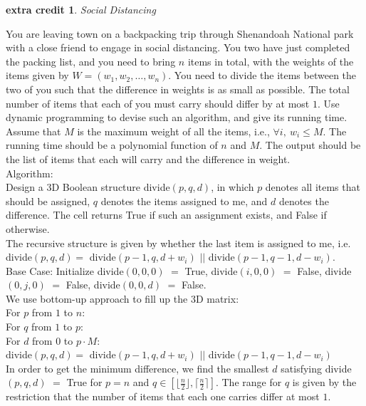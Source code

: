 \documentclass[10pt]{article}
\newtheorem{extra}{\sc\color{cit}extra credit}
\begin{document}
\begin{extra} Social Distancing \end{extra}

You are leaving town on a backpacking trip through Shenandoah National park with a close friend to engage in social distancing. You two have just completed the packing list, and you need to bring $n$ items in total, with the weights of the items given by $W=(w_1, w_2, \ldots, w_n)$. You need to divide the items between the two of you such that the difference in weights is as small as possible. The total number of items that each of you must carry should differ by at most $1$. Use dynamic programming to devise such an algorithm, and give its running time.  Assume that $M$ is the maximum weight of all the items, i.e., $\forall i, \ w_i \leq M$. The running time should be a polynomial function of $n$ and $M$. The output should be the list of items that each will carry and the difference in weight.
\\
Algorithm:\\
Design a 3D Boolean structure divide$(p, q, d)$, in which $p$ denotes all items that should be assigned, $q$ denotes the items assigned to me, and $d$ denotes the difference. The cell returns True if such an assignment exists, and False if otherwise.\\
The recursive structure is given by whether the last item is assigned to me, i.e. divide$(p, q, d) = $ divide$(p-1, q, d+w_i)$ $||$ divide$(p-1, q-1, d-w_i)$.\\
Base Case: Initialize divide$(0,0,0)$ $=$ True, divide$(i,0,0)$ $=$ False, divide$(0,j,0)$ $=$ False, divide$(0,0,d)$ $=$ False.\\
We use bottom-up approach to fill up the 3D matrix:\\
\-\hspace{0.5cm} For $p$ from $1$ to $n$:\\
\-\hspace{1cm} For $q$ from $1$ to $p$:\\
\-\hspace{1.5cm} For $d$ from $0$ to $p \cdot M$:\\
\-\hspace{2cm} divide$(p, q, d) = $ divide$(p-1, q, d+w_i)$ $||$ divide$(p-1, q-1, d-w_i)$\\
In order to get the minimum difference, we find the smallest $d$ satisfying divide$(p, q, d)$ $=$ True for $p=n$ and $q \in [ \lfloor \frac{n}{2} \rfloor, \lceil \frac{n}{2} \rceil]$. The range for $q$ is given by the restriction that the number of items that each one carries differ at most $1$.\\
\end{document}
